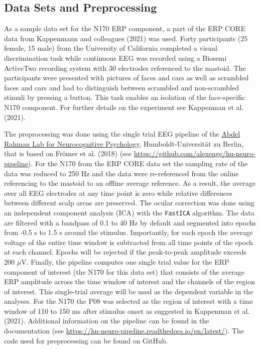 \documentclass[
  doc,12pt,floatsintext]{apa7}
\begin{document}
\subsection{Data Sets and Preprocessing}\label{data-sets-and-preprocessing}

As a sample data set for the N170 ERP component, a part of the ERP CORE data from Kappenmann and colleagues (2021) was used. Forty participants (25 female, 15 male) from the University of California completed a visual discrimination task while continuous EEG was recorded using a Biosemi ActiveTwo recording system with 30 electrodes referenced to the mastoid. The participants were presented with pictures of faces and cars as well as scrambled faces and cars and had to distinguish between scrambled and non-scrambled stimuli by pressing a button. This task enables an isolation of the face-specific N170 component. For further details on the experiment see Kappenman et al. (2021).

The preprocessing was done using the single trial EEG pipeline of the \href{https://abdelrahmanlab.com/}{Abdel Rahman Lab for Neurocognitive Psychology}, Humboldt-Universität zu Berlin, that is based on Frömer et al. (2018) (see \url{https://github.com/alexenge/hu-neuro-pipeline}). For the N170 from the ERP CORE data set the sampling rate of the data was reduced to 250 Hz and the data were re-referenced from the online referencing to the mastoid to an offline average reference. As a result, the average over all EEG electrodes at any time point is zero while relative differences between different scalp areas are preserved. The ocular correction was done using an independent component analysis (ICA) with the \texttt{FastICA} algorithm. The data are filtered with a bandpass of 0.1 to 40 Hz by default and segmented into epochs from -0.5 s to 1.5 s around the stimulus. Importantly, for each epoch the average voltage of the entire time window is subtracted from all time points of the epoch at each channel. Epochs will be rejected if the peak-to-peak amplitude exceeds 200 \(\mu\)V. Finally, the pipeline computes one single trial value for the ERP component of interest (the N170 for this data set) that consists of the average ERP amplitude across the time window of interest and the channels of the region of interest. This single-trial average will be used as the dependent variable in the analyses. For the N170 the P08 was selected as the region of interest with a time window of 110 to 150 ms after stimulus onset as suggested in Kappenman et al. (2021). Additional information on the pipeline can be found in the documentation (see \url{https://hu-neuro-pipeline.readthedocs.io/en/latest/}). The code used for preprocessing can be found on GitHub.
\end{document}
